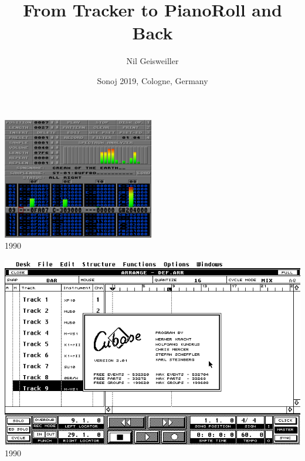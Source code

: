 \documentclass{beamer}
\title{From Tracker to PianoRoll and Back}
\author{Nil Geisweiller}
\date[Sonoj-19]
{Sonoj 2019, Cologne, Germany}
\begin{document}
\begin{frame}
  \maketitle
\end{frame}

\begin{frame}
  \begin{center}
    \includegraphics[scale=1.0]{images/protracker.png}\\
    1990
  \end{center}
\end{frame}

\begin{frame}
  \begin{center}
    \includegraphics[scale=0.5]{images/cubase_2-01_atari_st.png}\\
    1990
  \end{center}
\end{frame}
\end{document}

